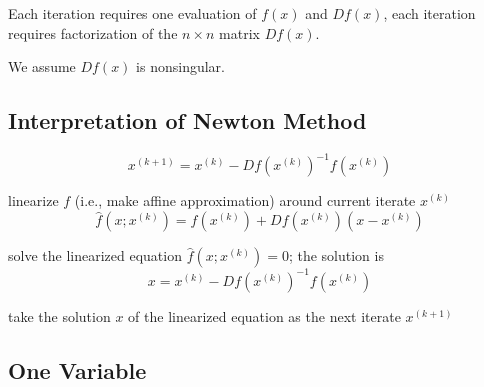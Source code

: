 Each iteration requires one evaluation of $ f(x) $ and $ D f(x) $, each iteration requires factorization of the $ n \times n $ matrix $ D f(x) $.

\begin{proposition}
    We assume $ D f(x) $ is nonsingular.
\end{proposition}

\subsection{Interpretation of Newton Method}

$$
x^{(k+1)}=x^{(k)}-D f\left(x^{(k)}\right)^{-1} f\left(x^{(k)}\right)
$$

linearize $ f $ (i.e., make affine approximation) around current iterate $ x^{(k)} $
$$
\hat{f}\left(x ; x^{(k)}\right)=f\left(x^{(k)}\right)+D f\left(x^{(k)}\right)\left(x-x^{(k)}\right)
$$

solve the linearized equation $ \hat{f}\left(x ; x^{(k)}\right)=0 $; the solution is
$$
x=x^{(k)}-D f\left(x^{(k)}\right)^{-1} f\left(x^{(k)}\right)
$$

take the solution $ x $ of the linearized equation as the next iterate $ x^{(k+1)} $

\subsection{One Variable}

